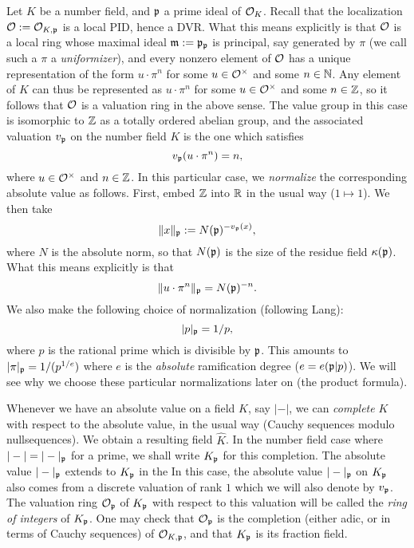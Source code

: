 Let $K$ be a number field, and $\mathfrak{p}$ a prime ideal of $\mathcal{O}_{K}$.
Recall that the localization $\mathcal{O} := \mathcal{O}_{K,\mathfrak{p}}$ is a local PID, hence a DVR.
What this means explicitly is that $\mathcal{O}$ is a local ring whose maximal ideal $\mathfrak{m} := \mathfrak{p}_{\mathfrak{p}}$ is principal, say generated by $\pi$ (we call such a $\pi$ a \emph{uniformizer}), and every nonzero element of $\mathcal{O}$ has a unique representation of the form $u \cdot \pi^{n}$ for some $u \in \mathcal{O}^{\times}$ and some $n \in \mathbb{N}$.
Any element of $K$ can thus be represented as $u \cdot \pi^{n}$ for some $u \in \mathcal{O}^{\times}$ and some $n \in \mathbb{Z}$, so it follows that $\mathcal{O}$ is a valuation ring in the above sense.
The value group in this case is isomorphic to $\mathbb{Z}$ as a totally ordered abelian group, and the associated valuation $v_{\mathfrak{p}}$ on the number field $K$ is the one which satisfies
\[ v_{\mathfrak{p}}(u \cdot \pi^{n}) = n, \]
where $u \in \mathcal{O}^{\times}$ and $n \in \mathbb{Z}$.
In this particular case, we \emph{normalize} the corresponding absolute value as follows.
First, embed $\mathbb{Z}$ into $\mathbb{R}$ in the usual way ($1 \mapsto 1$).
We then take
\[ \|x\|_{\mathfrak{p}} := N(\mathfrak{p})^{-v_{\mathfrak{p}}(x)}, \]
where $N$ is the absolute norm, so that $N(\mathfrak{p})$ is the size of the residue field $\kappa(\mathfrak{p})$.
What this means explicitly is that
\[ \|u \cdot \pi^{n}\|_{\mathfrak{p}} = N(\mathfrak{p})^{-n}. \]
We also make the following choice of normalization (following Lang):
\[ |p|_{\mathfrak{p}} = 1/p, \]
where $p$ is the rational prime which is divisible by $\mathfrak{p}$.
This amounts to $|\pi|_{\mathfrak{p}} = 1/(p^{1/e})$ where $e$ is the \emph{absolute} ramification degree ($e = e(\mathfrak{p}|p)$).
We will see why we choose these particular normalizations later on (the product formula).

Whenever we have an absolute value on a field $K$, say $|-|$, we can \emph{complete} $K$ with respect to the absolute value, in the usual way (Cauchy sequences modulo nullsequences).
We obtain a resulting field $\hat K$.
In the number field case where $|-| = |-|_{\mathfrak{p}}$ for a prime, we shall write $K_{\mathfrak{p}}$ for this completion.
The absolute value $|-|_{\mathfrak{p}}$ extends to $K_{\mathfrak{p}}$ in the 
In this case, the absolute value $|-|_{\mathfrak{p}}$ on $K_{\mathfrak{p}}$ also comes from a discrete valuation of rank $1$ which we will also denote by $v_{\mathfrak{p}}$.
The valuation ring $\mathcal{O}_{\mathfrak{p}}$ of $K_{\mathfrak{p}}$ with respect to this valuation will be called the \emph{ring of integers} of $K_{\mathfrak{p}}$.
One may check that $\mathcal{O}_{\mathfrak{p}}$ is the completion (either adic, or in terms of Cauchy sequences) of $\mathcal{O}_{K,\mathfrak{p}}$, and that $K_{\mathfrak{p}}$ is its fraction field.


